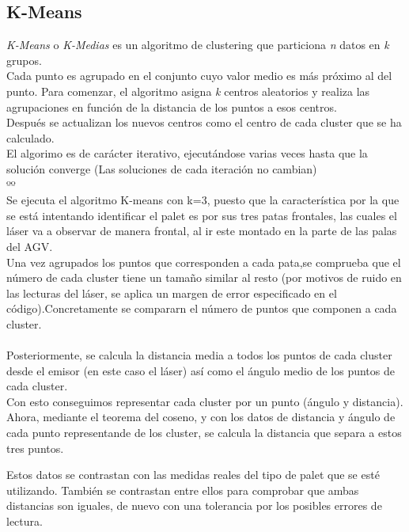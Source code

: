 		\subsection{K-Means}
		\emph{K-Means} o \emph{K-Medias} es un algoritmo de clustering que particiona \textit{n} datos en \textit{k} grupos.\\
Cada punto es agrupado en el conjunto cuyo valor medio es más próximo al del punto.
		Para comenzar, el algoritmo asigna \textit{k} centros aleatorios y realiza las agrupaciones en función de la distancia de los puntos a esos centros.\\
Después se actualizan los nuevos centros como el centro de cada cluster que se ha calculado.\\

		El algorimo es de carácter iterativo, ejecutándose varias veces hasta que la solución converge (Las soluciones de cada iteración no cambian) \\ ºº\\%

Se ejecuta el algoritmo K-means con k=3, puesto que la característica por la que se está intentando identificar el palet es por sus tres patas frontales, las cuales el láser va a observar de manera frontal, al ir este montado en la parte de las palas del AGV. \\
Una vez agrupados los puntos que corresponden a cada pata,se comprueba que el número de cada cluster tiene un tamaño similar al resto (por motivos de ruido en las lecturas del láser, se aplica un margen de error especificado en el código).Concretamente se compararn el número de puntos que componen a cada cluster.\\ \\
Posteriormente, se calcula la distancia media a todos los puntos de cada cluster desde el emisor (en este caso el láser) así como el ángulo medio de los puntos de cada cluster.\\
Con esto conseguimos representar cada cluster por un punto (ángulo y distancia).\\
Ahora, mediante el teorema del coseno, y con los datos de distancia y ángulo de cada punto representande de los cluster, se calcula la distancia que separa a estos tres puntos.\\


 Estos datos se contrastan con las medidas reales del tipo de palet que se esté utilizando. También se contrastan entre ellos para comprobar que ambas distancias son iguales, de nuevo con una tolerancia por los posibles errores de lectura.\\

